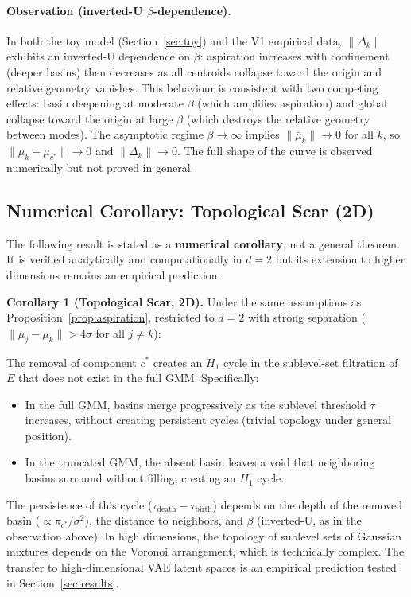 \documentclass[11pt]{article}
\begin{document}
\paragraph{Observation (inverted-U $\beta$-dependence).}
In both the toy model (Section~\ref{sec:toy}) and the V1 empirical data,
$\|\Delta_k\|$ exhibits an inverted-U dependence on $\beta$: aspiration
increases with confinement (deeper basins) then decreases as all centroids
collapse toward the origin and relative geometry vanishes.
This behaviour is consistent with two competing effects: basin deepening
at moderate $\beta$ (which amplifies aspiration) and global collapse toward
the origin at large $\beta$ (which destroys the relative geometry between
modes).
The asymptotic regime $\beta \to \infty$ implies $\|\bar{\mu}_k\| \to 0$
for all $k$, so $\|\mu_k - \mu_{c^*}\| \to 0$ and $\|\Delta_k\| \to 0$.
The full shape of the curve is observed numerically but not proved in general.


\subsection{Numerical Corollary: Topological Scar (2D)}
\label{sec:prop2}

The following result is stated as a \textbf{numerical corollary}, not a
general theorem.
It is verified analytically and computationally in $d = 2$ but its
extension to higher dimensions remains an empirical prediction.

\medskip
\noindent\textbf{Corollary 1 (Topological Scar, 2D).}
Under the same assumptions as Proposition~\ref{prop:aspiration}, restricted
to $d = 2$ with strong separation ($\|\mu_j - \mu_k\| > 4\sigma$ for all
$j \neq k$):

The removal of component $c^*$ creates an $H_1$ cycle in the sublevel-set
filtration of $E$ that does not exist in the full GMM.
Specifically:
\begin{itemize}
\item In the full GMM, basins merge progressively as the sublevel threshold
$\tau$ increases, without creating persistent cycles (trivial topology under
general position).
\item In the truncated GMM, the absent basin leaves a void that neighboring
basins surround without filling, creating an $H_1$ cycle.
\end{itemize}
The persistence of this cycle ($\tau_{\text{death}} - \tau_{\text{birth}}$)
depends on the depth of the removed basin ($\propto \pi_{c^*}/\sigma^2$),
the distance to neighbors, and $\beta$ (inverted-U, as in the observation
above).
In high dimensions, the topology of sublevel sets of Gaussian mixtures
depends on the Voronoi arrangement, which is technically complex.
The transfer to high-dimensional VAE latent spaces is an empirical prediction
tested in Section~\ref{sec:results}.
\end{document}
